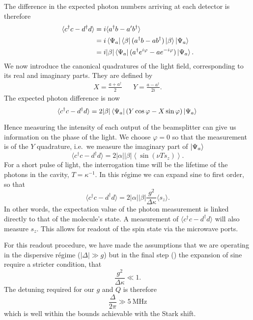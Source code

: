 The difference in the expected photon numbers arriving at each
detector is therefore
%
\begin{align}
  \langle c^\dagger c - d^\dagger d\rangle &= i\langle a^\dagger b-
  a'b^\dagger \rangle \\
  &= i \bra{\Psi_a}\bra{\beta}(a^\dagger b-
  ab^\dagger)\ket{\beta}\ket{\Psi_a} \\
  & = i|\beta| \bra{\Psi_a}(a^\dagger e^{i\varphi} - a
  e^{-i\varphi})\ket{\Psi_a}.
\end{align}
%
We now introduce the canonical quadratures of the light field, corresponding to
its real and imaginary parts. They are defined by~\cite{gerry_knight_2004}
%
\begin{align}
  X = \frac{a + a^\dagger}{2} && Y = \frac{a - a^\dagger}{2i}.
\end{align}
%
The expected photon difference is now
\begin{equation}
  \langle c^\dagger c - d^\dagger d\rangle =
  2|\beta|\bra{\Psi_a}(Y\cos\varphi - X\sin\varphi)\ket{\Psi_a} \\
  \label{squeeze:eqn:homoquads}
\end{equation}

Hence measuring the intensity of each output of the beamsplitter can give us
information on the phase of the light. We choose $\varphi = 0$ so that the
measurement is of the $Y$ quadrature, i.e.\ we measure the imaginary part of
$\ket{\Psi_a}$
%
\begin{equation}
  \langle c^\dagger c - d^\dagger d\rangle =  2
  |\alpha||\beta|\left\langle\sin(\nu T s_z)\right\rangle.
\end{equation}
%
For a short pulse of light, the interrogation time will be the lifetime of the
photons in the cavity, $T = \kappa^{-1}$. In this r\'egime we can expand sine
to first order, so that
%
\begin{equation}
  \langle c^\dagger c - d^\dagger d\rangle = 2|\alpha||\beta|
  \frac{g^2}{\Delta\kappa}\langle s_z\rangle.
  \label{mws:eqn:homomeas}
\end{equation}
%
In other words, the expectation value of the photon measurement is linked
directly to that of the molecule's state. A measurement of $\langle c^\dagger c
- d^\dagger d\rangle$ will also measure $s_z$. This allows for readout of the
spin state via the microwave ports.

For this readout procedure, we have made the assumptions that we are operating
in the dispersive r\'egime ($|\Delta| \gg g$) but in the final step
() the expansion of sine require a stricter
condition, that 
%
\begin{equation}
  \frac{g^2}{\Delta\kappa} \ll 1.
\end{equation}
%
The detuning required for our $g$ and $Q$ is therefore
%
\begin{equation}
  \frac{\Delta}{2 \pi} \gg \SI{5}{\mega\hertz}
\end{equation}
%
which is well within the bounds achievable with the Stark shift.

